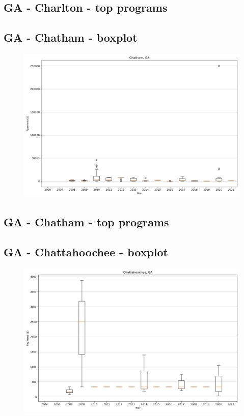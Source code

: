 \subsection*{GA - Charlton - top programs}

\newpage
\subsection*{GA - Chatham - boxplot}
\begin{figure}[h]
\centering
\includegraphics[width=7in]{../output/boxplots/counties/Chatham-GA_boxplot.png}
\end{figure}


\subsection*{GA - Chatham - top programs}

\newpage
\subsection*{GA - Chattahoochee - boxplot}
\begin{figure}[h]
\centering
\includegraphics[width=7in]{../output/boxplots/counties/Chattahoochee-GA_boxplot.png}
\end{figure}


